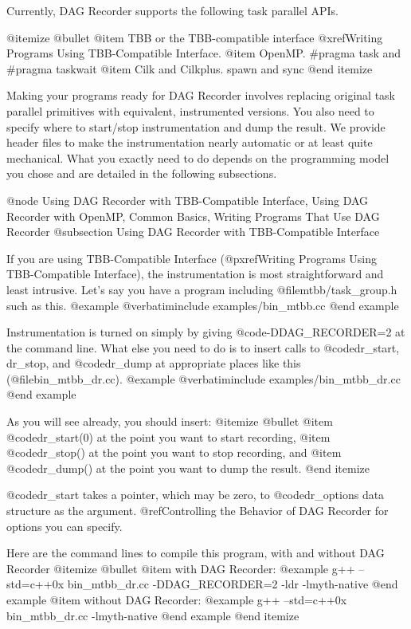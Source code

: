 Currently, DAG Recorder supports the following task parallel APIs.

@itemize @bullet
@item TBB or the TBB-compatible interface @xref{Writing Programs Using TBB-Compatible Interface}.
@item OpenMP. #pragma task and #pragma taskwait
@item Cilk and Cilkplus. spawn and sync
@end itemize

Making your programs ready for DAG Recorder involves replacing original
task parallel primitives with equivalent, instrumented versions.  You
also need to specify where to start/stop instrumentation and dump the
result.  We provide header files to make the instrumentation nearly
automatic or at least quite mechanical.  What you exactly need to do
depends on the programming model you chose and are detailed in the
following subsections.

@node Using DAG Recorder with TBB-Compatible Interface, Using DAG Recorder with OpenMP, Common Basics, Writing Programs That Use DAG Recorder
@subsection Using DAG Recorder with TBB-Compatible Interface

If you are using TBB-Compatible Interface (@pxref{Writing Programs Using TBB-Compatible Interface}), the instrumentation is most straightforward and least intrusive.  Let's say you have a program including @file{mtbb/task_group.h} such as this.
@example
@verbatiminclude examples/bin_mtbb.cc
@end example

Instrumentation is turned on simply by giving @code{-DDAG_RECORDER=2} at the command line.  What else you need to do is to insert calls to @code{dr_start, dr_stop,} and @code{dr_dump} at appropriate places like this  (@file{bin_mtbb_dr.cc}).
@example
@verbatiminclude examples/bin_mtbb_dr.cc
@end example

As you will see already, you should insert:
@itemize @bullet
@item @code{dr_start(0)} at the point you want to start recording,
@item @code{dr_stop()} at the point you want to stop recording, and
@item @code{dr_dump()} at the point you want to dump the result.
@end itemize

@code{dr_start} takes a pointer, which may be zero, to @code{dr_options} data structure as the argument.  
@ref{Controlling the Behavior of DAG Recorder} for options you can specify.

Here are the command lines to compile this program, with and without DAG Recorder
@itemize @bullet
@item with DAG Recorder:
@example
g++ --std=c++0x bin_mtbb_dr.cc -DDAG_RECORDER=2 -ldr -lmyth-native 
@end example
@item without DAG Recorder:
@example
g++ --std=c++0x bin_mtbb_dr.cc -lmyth-native
@end example
@end itemize

